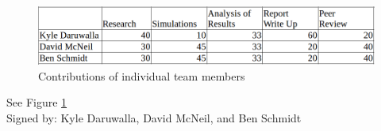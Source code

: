 \begin{figure}
    \centering
    \includegraphics[scale=0.4]{../images/statement_of_work.png}
    \caption{Contributions of individual team members}
    \label{fig:statement_of_work}
\end{figure}
See Figure \ref{fig:statement_of_work} \\
Signed by: Kyle Daruwalla, David McNeil, and Ben Schmidt